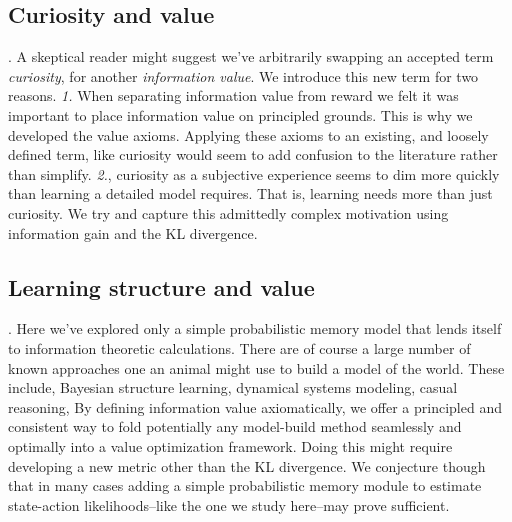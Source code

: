 \documentclass[9pt,twocolumn,twoside]{pnas-new}
\begin{document}




\subsection*{Curiosity and value}.
A skeptical reader might suggest we've arbitrarily swapping an accepted term \textit{curiosity}, for another \textit{information value}. We introduce this new term for two reasons. \textit{1.} When separating information value from reward we felt it was important to place  information value on principled grounds. This is why we developed the value axioms. Applying these axioms to an existing, and loosely defined term, like curiosity would seem to add confusion to the literature rather than simplify. \textit{2.}, curiosity as a subjective experience seems to dim more quickly than learning a detailed model requires. That is, learning needs more than just curiosity. We try and capture this admittedly complex motivation using information gain and the KL divergence.


\subsection*{Learning structure and value}.
Here we've explored only a simple probabilistic memory model that lends itself to information theoretic calculations. There are of course a large number of known approaches one an animal might use to build a model of the world. These include, Bayesian structure learning, dynamical systems modeling, casual reasoning, %
By defining information value axiomatically, we offer a principled and consistent way to fold potentially any model-build method seamlessly and optimally into a value optimization framework. Doing this might require developing a new metric other than the KL divergence. We conjecture though that in many cases adding a simple probabilistic memory module to estimate state-action likelihoods--like the one we study here--may prove sufficient.


\end{document}
